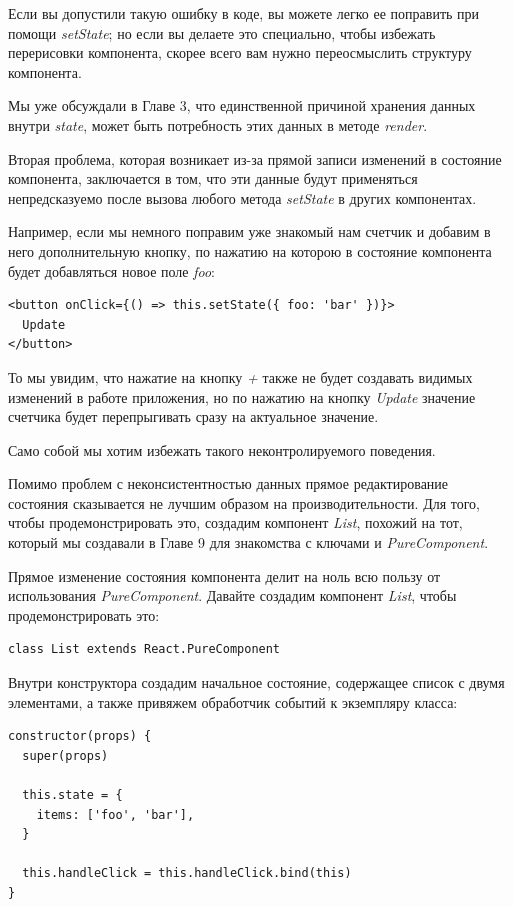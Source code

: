 Если вы допустили такую ошибку в коде, вы можете легко ее поправить при помощи \textit{setState}; но если вы делаете это специально, чтобы избежать перерисовки компонента, скорее всего вам нужно переосмыслить структуру компонента.

Мы уже обсуждали в Главе 3, что единственной причиной хранения данных внутри \textit{state}, может быть потребность этих данных в методе \textit{render}.

Вторая проблема, которая возникает из-за прямой записи изменений в состояние компонента, заключается в том, что эти данные будут применяться непредсказуемо после вызова любого метода \textit{setState} в других компонентах.

Например, если мы немного поправим уже знакомый нам счетчик и добавим в него дополнительную кнопку, по нажатию на которою в состояние компонента будет добавляться новое поле \textit{foo}:

\begin{lstlisting}
<button onClick={() => this.setState({ foo: 'bar' })}>
  Update
</button>
\end{lstlisting}

То мы увидим, что нажатие на кнопку \textit{+} также не будет создавать видимых изменений в работе приложения, но по нажатию на кнопку \textit{Update} значение счетчика будет перепрыгивать сразу на актуальное значение.

Само собой мы хотим избежать такого неконтролируемого поведения.

Помимо проблем с неконсистентностью данных прямое редактирование состояния сказывается не лучшим образом на производительности. Для того, чтобы продемонстрировать это, создадим компонент \textit{List}, похожий на тот, который мы создавали в Главе 9 для знакомства с ключами и \textit{PureComponent}.

Прямое изменение состояния компонента делит на ноль всю пользу от использования \textit{PureComponent}. Давайте создадим компонент \textit{List}, чтобы продемонстрировать это:

\begin{lstlisting}
class List extends React.PureComponent
\end{lstlisting}

Внутри конструктора создадим начальное состояние, содержащее список с двумя элементами, а также привяжем обработчик событий к экземпляру класса:

\begin{lstlisting}
constructor(props) {
  super(props)
  
  this.state = {
    items: ['foo', 'bar'],
  }
  
  this.handleClick = this.handleClick.bind(this)
}
\end{lstlisting}


